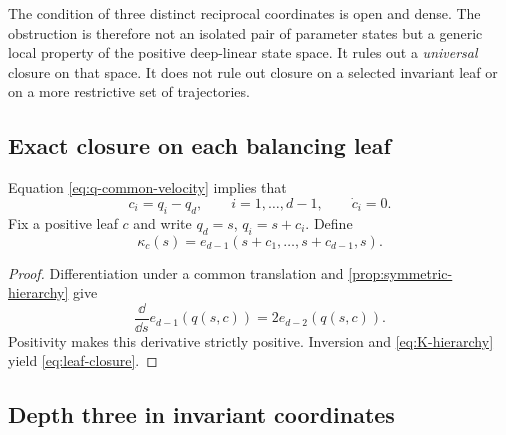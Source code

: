 The condition of three distinct reciprocal coordinates is open and dense.  The obstruction is therefore not an isolated pair of parameter states but a generic local property of the positive deep-linear state space.  It rules out a \emph{universal} closure on that space.  It does not rule out closure on a selected invariant leaf or on a more restrictive set of trajectories.

\subsection{Exact closure on each balancing leaf}

Equation \eqref{eq:q-common-velocity} implies that
\begin{equation}
  c_i=q_i-q_d,
  \qquad i=1,\ldots,d-1,
  \qquad \dot c_i=0.
  \label{eq:leaf-labels}
\end{equation}
Fix a positive leaf $c$ and write $q_d=s$, $q_i=s+c_i$.  Define
\begin{equation}
  \kappa_c(s)=e_{d-1}(s+c_1,\ldots,s+c_{d-1},s).
\end{equation}


\begin{proof}
Differentiation under a common translation and \cref{prop:symmetric-hierarchy} give
\begin{equation}
  \frac{\dd}{\dd s}e_{d-1}(q(s,c))=2e_{d-2}(q(s,c)).
\end{equation}
Positivity makes this derivative strictly positive.  Inversion and \eqref{eq:K-hierarchy} yield \eqref{eq:leaf-closure}.
\end{proof}

\subsection{Depth three in invariant coordinates}

